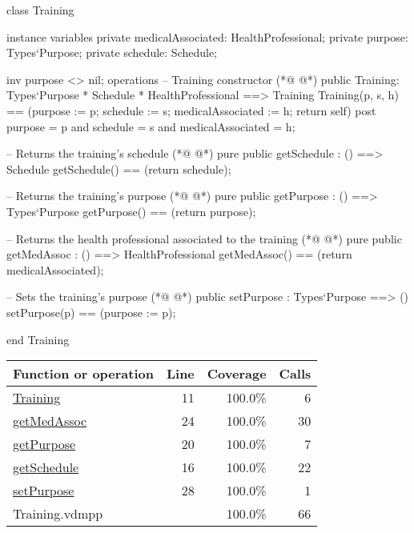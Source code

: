 \begin{vdmpp}[breaklines=true]
class Training
 
instance variables
 private medicalAssociated: HealthProfessional;
 private purpose: Types`Purpose;
 private schedule: Schedule;

 inv purpose <> nil;
operations
 -- Training constructor
(*@
\label{Training:11}
@*)
 public Training: Types`Purpose * Schedule * HealthProfessional ==> Training
   Training(p, s, h) == (purpose := p; schedule := s; medicalAssociated := h; return self)
 post purpose = p and schedule = s and medicalAssociated = h;
 
 -- Returns the training's schedule
(*@
\label{getSchedule:16}
@*)
 pure public getSchedule : () ==> Schedule
   getSchedule() == (return schedule);
 
 -- Returns the training's purpose
(*@
\label{getPurpose:20}
@*)
  pure public getPurpose : () ==> Types`Purpose
  getPurpose() == (return purpose); 
 
 -- Returns the health professional associated to the training
(*@
\label{getMedAssoc:24}
@*)
 pure public getMedAssoc : () ==> HealthProfessional
  getMedAssoc() == (return medicalAssociated); 
 
 -- Sets the training's purpose
(*@
\label{setPurpose:28}
@*)
 public setPurpose : Types`Purpose ==> ()
   setPurpose(p) == (purpose := p);
 
 end Training
\end{vdmpp}
\bigskip
\begin{longtable}{|l|r|r|r|}
\hline
Function or operation & Line & Coverage & Calls \\
\hline
\hline
\hyperref[Training:11]{Training} & 11&100.0\% & 6 \\
\hline
\hyperref[getMedAssoc:24]{getMedAssoc} & 24&100.0\% & 30 \\
\hline
\hyperref[getPurpose:20]{getPurpose} & 20&100.0\% & 7 \\
\hline
\hyperref[getSchedule:16]{getSchedule} & 16&100.0\% & 22 \\
\hline
\hyperref[setPurpose:28]{setPurpose} & 28&100.0\% & 1 \\
\hline
\hline
Training.vdmpp & & 100.0\% & 66 \\
\hline
\end{longtable}

